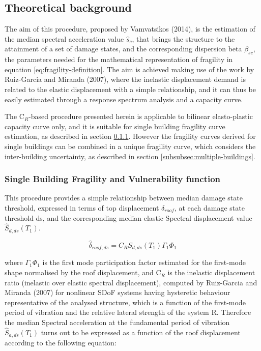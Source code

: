\subsection{Theoretical background}
The aim of this procedure, proposed by Vamvatsikos (2014), is the estimation of the median spectral acceleration value $\hat{s}_c$, that brings the structure to the attainment of a set of damage states, and the corresponding dispersion beta $\beta_{sc}$, the parameters needed for the mathematical representation of fragility in equation \ref{eq:fragility-definition}. The aim is achieved making use of the work by Ruiz-Garcia and Miranda (2007), where the inelastic displacement demand is related to the elastic displacement with a simple relationship, and it can thus be easily estimated through a response spectrum analysis and a capacity curve.

The C$_R$-based procedure presented herein is applicable to bilinear elasto-plastic capacity curve only, and it is suitable for single building fragility curve estimation, as described in section \ref{subsubsec:single-building}. However the fragility curves derived for single buildings can be combined in a unique fragility curve, which considers the inter-building uncertainty, as described in section \ref{subsubsec:multiple-buildings}.

\subsubsection{Single Building Fragility and Vulnerability function}
\label{subsubsec:single-building}
This procedure provides a simple relationship between median damage state threshold, expressed in terms of top displacement $\delta_{roof}$, at each damage state threshold ds, and the corresponding median elastic Spectral displacement value $\hat{S}_{d,ds}(T_1)$.

\begin{equation}
\hat{\delta}_{roof, ds} = C_R S_{d, ds}(T_1) \Gamma_1 \Phi_1
\end{equation}

where $\Gamma_1 \Phi_1$ is the first mode participation factor estimated for the first-mode shape normalised by the roof displacement, and C$_R$ is the inelastic displacement ratio (inelastic over elastic spectral displacement), computed by Ruiz-Garcia and Miranda (2007) for nonlinear SDoF systems having hysteretic behaviour representative of the analysed structure, which is a function of the first-mode period of vibration and the relative lateral strength of the system R. Therefore the median Spectral acceleration at the fundamental period of vibration $\hat{S}_{a,ds}(T_1)$ turns out to be expressed as a function of the roof displacement according to the following equation:

